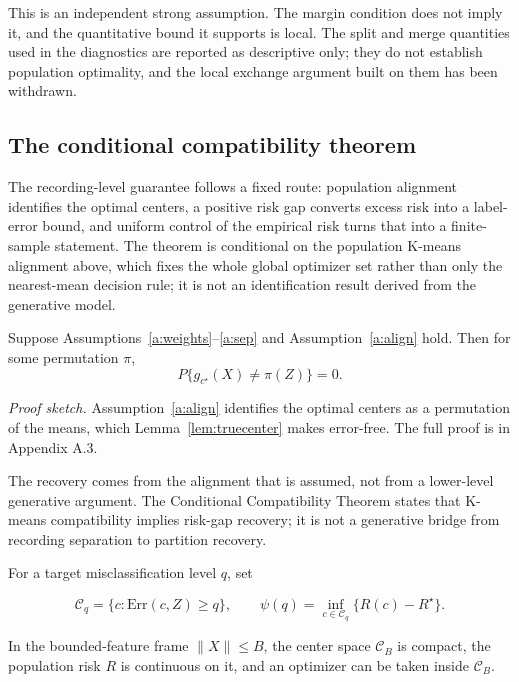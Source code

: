This is an independent strong assumption. The margin condition does not
imply it, and the quantitative bound it supports is local. The split and
merge quantities used in the diagnostics are reported as descriptive
only; they do not establish population optimality, and the local
exchange argument built on them has been withdrawn.

\subsection{The conditional compatibility
theorem}\label{the-conditional-compatibility-theorem}

The recording-level guarantee follows a fixed route: population
alignment identifies the optimal centers, a positive risk gap converts
excess risk into a label-error bound, and uniform control of the
empirical risk turns that into a finite-sample statement. The theorem is
conditional on the population K-means alignment above, which fixes the
whole global optimizer set rather than only the nearest-mean decision
rule; it is not an identification result derived from the generative
model.

\begin{theorem}\label{thm:A}
Suppose Assumptions~\ref{a:weights}--\ref{a:sep} and Assumption~\ref{a:align} hold. Then for some permutation $\pi$,
$$P\{g_{c^\star}(X)\ne\pi(Z)\}=0.$$
\end{theorem}

\emph{Proof sketch.} Assumption~\ref{a:align} identifies
the optimal centers as a permutation of the means, which
Lemma~\ref{lem:truecenter} makes error-free. The full
proof is in Appendix A.3.

The recovery comes from the alignment that is assumed, not from a
lower-level generative argument. The Conditional Compatibility Theorem
states that K-means compatibility implies risk-gap recovery; it is not a
generative bridge from recording separation to partition recovery.

For a target misclassification level \(q\), set

\begin{equation}\label{eq:margin}
\mathcal C_q=\{c:\mathrm{Err}(c,Z)\ge q\},\qquad
\psi(q)=\inf_{c\in\mathcal C_q}\{R(c)-R^\star\}.
\end{equation}

\begin{lemma}\label{lem:compact}
In the bounded-feature frame $\|X\|\le B$, the center space $\mathcal C_B$ is compact, the population risk $R$ is continuous on it, and an optimizer can be taken inside $\mathcal C_B$.
\end{lemma}

